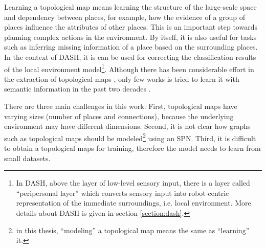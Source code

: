 \documentclass[10pt, titlepage]{article}
\theoremstyle{definition}
\begin{document}
Learning a topological map means learning the structure of the large-scale space and dependency between places, for example, how the evidence of a group of places influence the attributes of other places. This is an important step towards planning complex actions in the environment. By itself, it is also useful for tasks such as inferring missing information of a place based on the surrounding places. In the context of DASH, it is can be used for correcting the classification results of the local environment model\footnote{In DASH, above the layer of low-level sensory input, there is a layer called ``peripersonal layer'' which converts sensory input into robot-centric representation of the immediate surroundings, i.e. local environment. More details about DASH is given in section \ref{section:dash}.}. Although there has been considerable effort in the extraction of topological maps \cite{friedman2007voronoi}\cite{ranganathan2011online}\cite{shi2010online}\cite{tomatis2003hybrid}, only few works is tried to learn it with semantic information in the past two decades \cite{aydemir2012can}\cite{friedman2007voronoi}\cite{mozos2006supervised}.


There are three main challenges in this work. First, topological maps have varying sizes (number of places and connections), because the underlying environment may have different dimensions. Second, it is not clear how graphs such as topological maps should be modeled\footnote{in this thesis, ``modeling'' a topological map means the same as ``learning'' it.} using an SPN. Third, it is difficult to obtain a topological maps for training, therefore the model needs to learn from small datasets.

\end{document}
